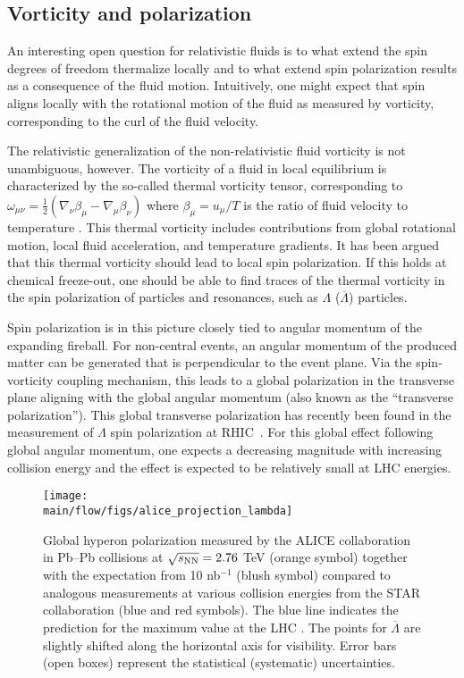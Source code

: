 \subsection{Vorticity and polarization}

An interesting open question for relativistic fluids is to what extend the spin degrees of freedom thermalize locally and to what extend spin polarization results as a consequence of the fluid motion. Intuitively, one might expect that spin aligns locally with the rotational motion of the fluid as measured by vorticity, corresponding to the curl of the fluid velocity.

The relativistic generalization of the non-relativistic fluid vorticity is not unambiguous, however. The vorticity of a fluid in local equilibrium is characterized by the so-called thermal vorticity tensor, corresponding to $\omega_{\mu\nu} = \frac{1}{2} (\nabla_\nu \beta_\mu - \nabla_\mu \beta_\nu)$ where $\beta_\mu=u_\mu / T$ is the ratio of fluid velocity to temperature \cite{Becattini:2013fla}. This thermal vorticity includes contributions from global rotational motion, local fluid acceleration, and temperature gradients. It has been argued that this thermal vorticity should lead to local spin polarization. If this holds at chemical freeze-out, one should be able to find traces of the thermal vorticity in the spin polarization of particles and resonances, such as $\Lambda$ ($\overline{\Lambda}$) particles.

Spin polarization is in this picture closely tied to angular momentum of the expanding fireball. For non-central events, an angular momentum of the produced matter can be generated that is perpendicular to the event plane. Via the spin-vorticity coupling mechanism, this leads to a global polarization in the transverse plane aligning with the global angular momentum (also known as the ``transverse polarization''). This global transverse polarization has recently been found in the measurement of $\Lambda$ spin polarization at RHIC~\cite{STAR:2017ckg}. For this global effect following global angular momentum, one expects a decreasing magnitude with increasing collision energy and the effect is expected to be relatively small at LHC energies. 

\begin{figure*}[!htb]
\begin{center}
\texttt{[image: \\main/flow/figs/alice\_projection\_lambda]}
\caption{Global hyperon polarization measured by the ALICE collaboration in Pb--Pb collisions at $\sqrt{s_{\mathrm{NN}}}=2.76$ TeV (orange symbol) together with the expectation from 10 nb$^{-1}$ (blush symbol) compared to analogous measurements at various collision energies from the STAR collaboration \cite{STAR:2017ckg, Abelev:2007zk} (blue and red symbols). The blue line indicates the prediction for the maximum value at the LHC \cite{Voloshin:ICPPA2}. The points for $\overline{\Lambda}$ are slightly shifted along the horizontal axis for visibility.  Error bars (open boxes) represent the statistical (systematic) uncertainties.}
\label{fig:alice_lambda}
\end{center}
\end{figure*}

